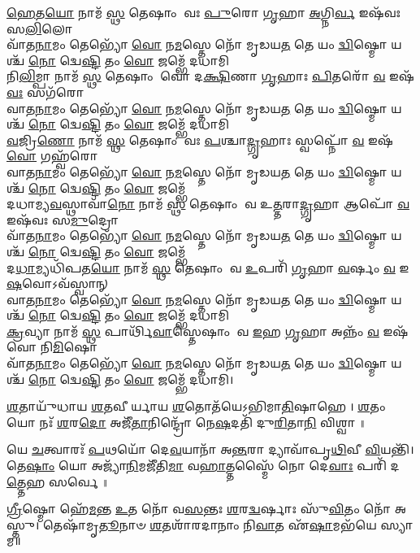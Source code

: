 \-\ul{𑌹𑍇}\-𑌤\-\ul{𑌯𑍋} 𑌨𑌾𑌮᳴ \ul{𑌸𑍍𑌥} 𑌤𑍇𑌷𑌾𑌂 𑌵𑌃 \ul{𑌪𑍁}\-𑌰𑍋 \ul{𑌗𑍃}\-𑌹𑌾 \ul{𑌅}\-𑌗𑍍𑌨𑌿\-\ul{𑌰𑍍𑌵} 𑌇𑌷᳴𑌵𑌃 𑌸\-\ul{𑌲𑌿}\-𑌲𑍋\\ 
𑌵𑌾᳴𑌤\-\ul{𑌨𑌾}\-𑌮𑌂 𑌤𑍇𑌭𑍍𑌯𑍋᳴ \ul{𑌵𑍋} 𑌨\-\ul{𑌮}\-𑌸𑍍𑌤𑍇 𑌨𑍋᳴ 𑌮𑍃𑌡𑌯\-\ul{𑌤} 𑌤𑍇 𑌯𑌂 \ul{𑌦𑍍𑌵𑌿}\-𑌷𑍍𑌮𑍋 𑌯𑌶𑍍𑌚᳴ \ul{𑌨𑍋} 𑌦𑍍𑌵𑍇\-\ul{𑌷𑍍𑌟𑌿} 𑌤𑌂 \ul{𑌵𑍋} 𑌜𑌮𑍍𑌭𑍇᳴ 𑌦𑌧𑌾𑌮𑌿\\
𑌨𑌿\-\ul{𑌲𑌿}\-𑌮𑍍𑌪𑌾 𑌨𑌾𑌮᳴ \ul{𑌸𑍍𑌥} 𑌤𑍇𑌷𑌾𑌂 𑌵𑍋 𑌦\-\ul{𑌕𑍍𑌷𑌿}\-𑌣𑌾 \ul{𑌗𑍃}\-𑌹𑌾𑌃 \ul{𑌪𑌿}\-𑌤𑌰𑍋᳴ \ul{𑌵} 𑌇𑌷᳴\-\ul{𑌵𑌃} 𑌸𑌗᳴𑌰𑍋\\ 
𑌵𑌾𑌤\-\ul{𑌨𑌾}\-𑌮𑌂 𑌤𑍇𑌭𑍍𑌯𑍋᳴ \ul{𑌵𑍋} 𑌨\-\ul{𑌮}\-𑌸𑍍𑌤𑍇 𑌨𑍋᳴ 𑌮𑍃𑌡𑌯\-\ul{𑌤} 𑌤𑍇 𑌯𑌂 \ul{𑌦𑍍𑌵𑌿}\-𑌷𑍍𑌮𑍋 𑌯𑌶𑍍𑌚᳴ \ul{𑌨𑍋} 𑌦𑍍𑌵𑍇\-\ul{𑌷𑍍𑌟𑌿} 𑌤𑌂 \ul{𑌵𑍋} 𑌜𑌮𑍍𑌭𑍇᳴ 𑌦𑌧𑌾𑌮𑌿\\
\-\ul{𑌵}\-𑌜𑍍𑌰𑌿\-\ul{𑌣𑍋} 𑌨𑌾𑌮᳴ \ul{𑌸𑍍𑌥} 𑌤𑍇𑌷𑌾𑌂 𑌵𑌃 \ul{𑌪}\-𑌶𑍍𑌚𑌾\-\ul{𑌦𑍍𑌗𑍃}\-𑌹𑌾𑌃 𑌸𑍍𑌵𑌪𑍍𑌨𑍋᳴ \ul{𑌵} 𑌇𑌷᳴\-\ul{𑌵𑍋} 𑌗𑌹𑍍𑌵᳴𑌰𑍋\\ 
𑌵𑌾𑌤\-\ul{𑌨𑌾}\-𑌮𑌂 𑌤𑍇𑌭𑍍𑌯𑍋᳴ \ul{𑌵𑍋} 𑌨\-\ul{𑌮}\-𑌸𑍍𑌤𑍇 𑌨𑍋᳴ 𑌮𑍃𑌡𑌯\-\ul{𑌤} 𑌤𑍇 𑌯𑌂 \ul{𑌦𑍍𑌵𑌿}\-𑌷𑍍𑌮𑍋 𑌯𑌶𑍍𑌚᳴ \ul{𑌨𑍋} 𑌦𑍍𑌵𑍇\-\ul{𑌷𑍍𑌟𑌿} 𑌤𑌂 \ul{𑌵𑍋} 𑌜𑌮𑍍𑌭𑍇᳴\\
𑌦𑌧𑌾𑌮𑍍𑌯\-\ul{𑌵}\-𑌸𑍍𑌥𑌾𑌵𑌾᳴\-\ul{𑌨𑍋} 𑌨𑌾𑌮᳴ \ul{𑌸𑍍𑌥} 𑌤𑍇𑌷𑌾𑌂 𑌵 𑌉\-\ul{𑌤𑍍𑌤}\-𑌰𑌾\-\ul{𑌦𑍍𑌗𑍃}\-𑌹𑌾 𑌆𑌪𑍋᳴ \ul{𑌵} 𑌇𑌷᳴𑌵𑌃 𑌸\-\ul{𑌮𑍁}\-𑌦𑍍𑌰𑍋\\ 
𑌵𑌾᳴𑌤\-\ul{𑌨𑌾}\-𑌮𑌂 𑌤𑍇𑌭𑍍𑌯𑍋᳴ \ul{𑌵𑍋} 𑌨\-\ul{𑌮}\-𑌸𑍍𑌤𑍇 𑌨𑍋᳴ 𑌮𑍃𑌡𑌯\-\ul{𑌤} 𑌤𑍇 𑌯𑌂 \ul{𑌦𑍍𑌵𑌿}\-𑌷𑍍𑌮𑍋 𑌯𑌶𑍍𑌚᳴ \ul{𑌨𑍋} 𑌦𑍍𑌵𑍇\-\ul{𑌷𑍍𑌟𑌿} 𑌤𑌂 \ul{𑌵𑍋} 𑌜𑌮𑍍𑌭𑍇᳴\\
𑌦\-\ul{𑌧𑌾}\-𑌮𑍍𑌯𑌧𑌿᳴𑌪𑌤\-\ul{𑌯𑍋} 𑌨𑌾𑌮᳴ \ul{𑌸𑍍𑌥} 𑌤𑍇𑌷𑌾𑌂 𑌵 \ul{𑌉}\-𑌪𑌰𑌿᳴ \ul{𑌗𑍃}\-𑌹𑌾 \ul{𑌵}\-𑌰𑍍\mbox{}𑌷𑌂 \ul{𑌵} 𑌇\-\ul{𑌷}\-𑌵𑍋𑌽𑌵᳴𑌸𑍍𑌵𑌾𑌨𑍍\\ 
𑌵𑌾𑌤\-\ul{𑌨𑌾}\-𑌮𑌂 𑌤𑍇𑌭𑍍𑌯𑍋᳴ \ul{𑌵𑍋} 𑌨\-\ul{𑌮}\-𑌸𑍍𑌤𑍇 𑌨𑍋᳴ 𑌮𑍃𑌡𑌯\-\ul{𑌤} 𑌤𑍇 𑌯𑌂 \ul{𑌦𑍍𑌵𑌿}\-𑌷𑍍𑌮𑍋 𑌯𑌶𑍍𑌚᳴ \ul{𑌨𑍋} 𑌦𑍍𑌵𑍇\-\ul{𑌷𑍍𑌟𑌿} 𑌤𑌂 \ul{𑌵𑍋} 𑌜𑌮𑍍𑌭𑍇᳴ 𑌦𑌧𑌾𑌮𑌿\\
\-\ul{𑌕𑍍𑌰}\-𑌵𑍍𑌯𑌾 𑌨𑌾𑌮᳴ \ul{𑌸𑍍𑌥} 𑌪𑌾𑌰𑍍𑌥𑌿᳴\-\ul{𑌵𑌾}\-𑌸𑍍𑌤𑍇𑌷𑌾𑌂 𑌵 \ul{𑌇}\-𑌹 \ul{𑌗𑍃}\-𑌹𑌾 𑌅𑌨𑍍𑌨𑌂᳴ \ul{𑌵} 𑌇𑌷᳴𑌵𑍋 𑌨𑌿\-\ul{𑌮𑌿}\-𑌷𑍋\\ 
𑌵𑌾᳴𑌤\-\ul{𑌨𑌾}\-𑌮𑌂 𑌤𑍇𑌭𑍍𑌯𑍋᳴ \ul{𑌵𑍋} 𑌨\-\ul{𑌮}\-𑌸𑍍𑌤𑍇 𑌨𑍋᳴ 𑌮𑍃𑌡𑌯\-\ul{𑌤} 𑌤𑍇 𑌯𑌂 \ul{𑌦𑍍𑌵𑌿}\-𑌷𑍍𑌮𑍋 𑌯𑌶𑍍𑌚᳴ \ul{𑌨𑍋} 𑌦𑍍𑌵𑍇\-\ul{𑌷𑍍𑌟𑌿} 𑌤𑌂 \ul{𑌵𑍋} 𑌜𑌮𑍍𑌭𑍇᳴ 𑌦𑌧𑌾𑌮𑌿।

\-\ul{𑌶}\-𑌤𑌾𑌯𑍁᳴𑌧𑌾𑌯 \ul{𑌶}\-𑌤𑌵𑍀𑌰𑍍𑌯𑌾𑌯 \ul{𑌶}\-𑌤𑍋𑌤᳴𑌯𑍇𑌽𑌭𑌿𑌮𑌾\-\ul{𑌤𑌿}\-𑌷𑌾𑌹𑍇।
\-\ul{𑌶}\-𑌤𑌂 𑌯𑍋 𑌨𑌃᳴ \ul{𑌶}\-𑌰\-\ul{𑌦𑍋} 𑌅𑌜𑍀᳴\-\ul{𑌤𑌾}\-𑌨𑌿𑌨𑍍𑌦𑍍𑌰𑍋᳴ 𑌨𑍇\-\ul{𑌷}\-𑌦𑌤𑌿᳴ 𑌦𑍁\-\ul{𑌰𑌿}\-𑌤𑌾\-\ul{𑌨𑌿} 𑌵𑌿𑌶𑍍𑌵𑌾॥

𑌯𑍇 \ul{𑌚}\-𑌤𑍍𑌵𑌾𑌰𑌃᳴ \ul{𑌪}\-𑌥𑌯𑍋᳴ 𑌦𑍇\-\ul{𑌵}\-𑌯𑌾𑌨𑌾᳴ 𑌅\-\ul{𑌨𑍍𑌤}\-𑌰𑌾 𑌦𑍍𑌯𑌾𑌵𑌾᳴𑌪𑍃\-\ul{𑌥𑌿}\-𑌵𑍀 \ul{𑌵𑌿}\-𑌯𑌨𑍍𑌤𑌿᳴।
𑌤𑍇\-\ul{𑌷𑌾𑌂} 𑌯𑍋 𑌅𑌜𑍍𑌯𑌾᳴\-\ul{𑌨𑌿}\-𑌮𑌜𑍀᳴𑌤𑌿\-\ul{𑌮𑌾} 𑌵\-\ul{𑌹𑌾}\-𑌤𑍍𑌤𑌸𑍍𑌮𑍈᳴ 𑌨𑍋 𑌦𑍇\-\ul{𑌵𑌾𑌃} 𑌪𑌰𑌿᳴ 𑌦\-\ul{𑌤𑍍𑌤𑍇}\-𑌹 𑌸𑌰𑍍𑌵𑍇॥

\-\ul{𑌗𑍍𑌰𑍀}\-𑌷𑍍𑌮𑍋 𑌹𑍇᳴\-\ul{𑌮}\-𑌨𑍍𑌤 \ul{𑌉}\-𑌤 𑌨𑍋᳴ 𑌵\-\ul{𑌸}\-𑌨𑍍𑌤𑌃 \ul{𑌶}\-𑌰\-\ul{𑌦𑍍𑌵}\-𑌰𑍍𑌷𑌾𑌃 𑌸𑍁᳴\-\ul{𑌵𑌿}\-𑌤𑌂 𑌨𑍋᳴ 𑌅𑌸𑍍𑌤𑍁।
𑌤𑍇𑌷𑌾᳴𑌮𑍃\-\ul{𑌤𑍂}\-𑌨𑌾𑍞 \ul{𑌶}\-𑌤𑌶𑌾᳴𑌰𑌦𑌾𑌨𑌾𑌂 𑌨𑌿\-\ul{𑌵𑌾}\-𑌤 𑌏᳴\-\ul{𑌷𑌾}\-𑌮𑌭᳴𑌯𑍇 𑌸𑍍𑌯𑌾𑌮॥

